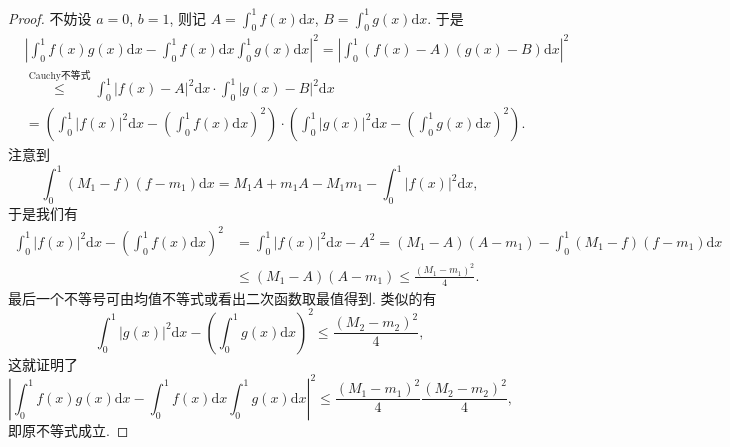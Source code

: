 \documentclass[../../main.tex]{subfiles}
\begin{document}
\begin{proof}
不妨设 $a = 0$, $b = 1$, 则记 $A = \int_{0}^{1}f(x)\mathrm{d}x$, $B = \int_{0}^{1}g(x)\mathrm{d}x$. 于是
\begin{align*}
&\left|\int_{0}^{1}f(x)g(x)\mathrm{d}x - \int_{0}^{1}f(x)\mathrm{d}x\int_{0}^{1}g(x)\mathrm{d}x\right|^2 = \left|\int_{0}^{1}(f(x) - A)(g(x) - B)\mathrm{d}x\right|^2
\\
&\stackrel{\hyperref[theorem:Cauchy不等式(一般版本)]{\text{Cauchy不等式}}}{\leqslant } \int_{0}^{1}|f(x) - A|^2\mathrm{d}x \cdot \int_{0}^{1}|g(x) - B|^2\mathrm{d}x
\\
&= \left(\int_{0}^{1}|f(x)|^2\mathrm{d}x - \left(\int_{0}^{1}f(x)\mathrm{d}x\right)^2\right) \cdot \left(\int_{0}^{1}|g(x)|^2\mathrm{d}x - \left(\int_{0}^{1}g(x)\mathrm{d}x\right)^2\right).
\end{align*}
注意到
\[
\int_{0}^{1}(M_1 - f)(f - m_1)\mathrm{d}x = M_1A + m_1A - M_1m_1 - \int_{0}^{1}|f(x)|^2\mathrm{d}x,
\]
于是我们有
\begin{align*}
\int_{0}^{1}|f(x)|^2\mathrm{d}x - \left(\int_{0}^{1}f(x)\mathrm{d}x\right)^2 &=\int_{0}^{1}|f(x)|^2\mathrm{d}x -A^2
= (M_1 - A)(A - m_1) - \int_{0}^{1}(M_1 - f)(f - m_1)\mathrm{d}x\\
&\leqslant  (M_1-A)(A-m_1)\leqslant  \frac{(M_1-m_1)^2}{4}.
\end{align*}
最后一个不等号可由均值不等式或看出二次函数取最值得到.
类似的有
\[
\int_{0}^{1}|g(x)|^2\mathrm{d}x - \left(\int_{0}^{1}g(x)\mathrm{d}x\right)^2 \leqslant  \frac{(M_2 - m_2)^2}{4},
\]
这就证明了
\[
\left|\int_{0}^{1}f(x)g(x)\mathrm{d}x - \int_{0}^{1}f(x)\mathrm{d}x\int_{0}^{1}g(x)\mathrm{d}x\right|^2 \leqslant  \frac{(M_1 - m_1)^2}{4}\frac{(M_2 - m_2)^2}{4},
\]
即原不等式成立. 

\end{proof}
\end{document}
